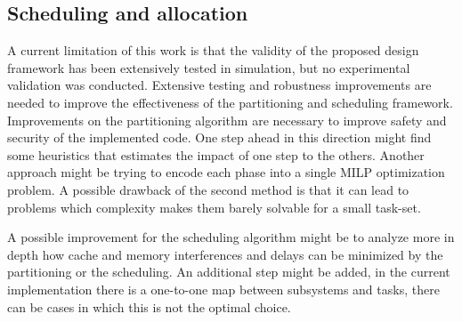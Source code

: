 \subsection{Scheduling and allocation}
A current limitation of this work is that the validity of the proposed design framework has been extensively tested in simulation, but no experimental validation was conducted. Extensive testing and robustness improvements are needed to improve the effectiveness of the partitioning and scheduling framework. Improvements on the partitioning algorithm are necessary to improve safety and security of the implemented code. One step ahead in this direction might find some heuristics that estimates the impact of one step to the others. Another approach might be trying to encode each phase into a single MILP optimization problem. A possible drawback of the second method is that it can lead to problems which complexity makes them barely solvable for a small task-set. 
\par A possible improvement for the scheduling algorithm might be to analyze more in depth how cache and memory interferences and delays can be minimized by the partitioning or the scheduling. An additional step might be added, in the current implementation there is a one-to-one map between subsystems and tasks, there can be cases in which this is not the optimal choice.

